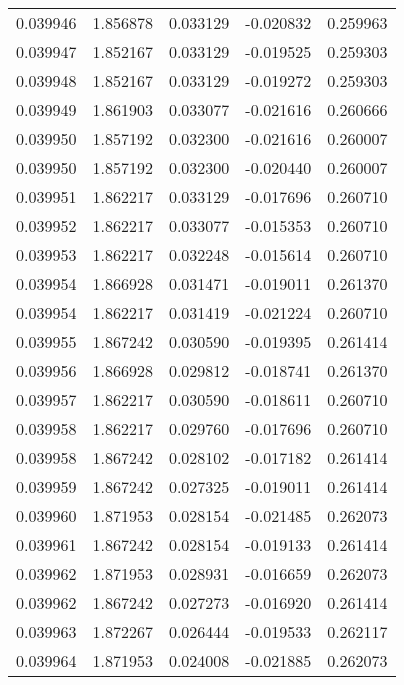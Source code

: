 \begin{tabular}{lrrrr}
0.039946    &  1.856878 &  0.033129 & -0.020832 &             0.259963 \\
0.039947    &  1.852167 &  0.033129 & -0.019525 &             0.259303 \\
0.039948    &  1.852167 &  0.033129 & -0.019272 &             0.259303 \\
0.039949    &  1.861903 &  0.033077 & -0.021616 &             0.260666 \\
0.039950    &  1.857192 &  0.032300 & -0.021616 &             0.260007 \\
0.039950    &  1.857192 &  0.032300 & -0.020440 &             0.260007 \\
0.039951    &  1.862217 &  0.033129 & -0.017696 &             0.260710 \\
0.039952    &  1.862217 &  0.033077 & -0.015353 &             0.260710 \\
0.039953    &  1.862217 &  0.032248 & -0.015614 &             0.260710 \\
0.039954    &  1.866928 &  0.031471 & -0.019011 &             0.261370 \\
0.039954    &  1.862217 &  0.031419 & -0.021224 &             0.260710 \\
0.039955    &  1.867242 &  0.030590 & -0.019395 &             0.261414 \\
0.039956    &  1.866928 &  0.029812 & -0.018741 &             0.261370 \\
0.039957    &  1.862217 &  0.030590 & -0.018611 &             0.260710 \\
0.039958    &  1.862217 &  0.029760 & -0.017696 &             0.260710 \\
0.039958    &  1.867242 &  0.028102 & -0.017182 &             0.261414 \\
0.039959    &  1.867242 &  0.027325 & -0.019011 &             0.261414 \\
0.039960    &  1.871953 &  0.028154 & -0.021485 &             0.262073 \\
0.039961    &  1.867242 &  0.028154 & -0.019133 &             0.261414 \\
0.039962    &  1.871953 &  0.028931 & -0.016659 &             0.262073 \\
0.039962    &  1.867242 &  0.027273 & -0.016920 &             0.261414 \\
0.039963    &  1.872267 &  0.026444 & -0.019533 &             0.262117 \\
0.039964    &  1.871953 &  0.024008 & -0.021885 &             0.262073 \\

\end{tabular}
